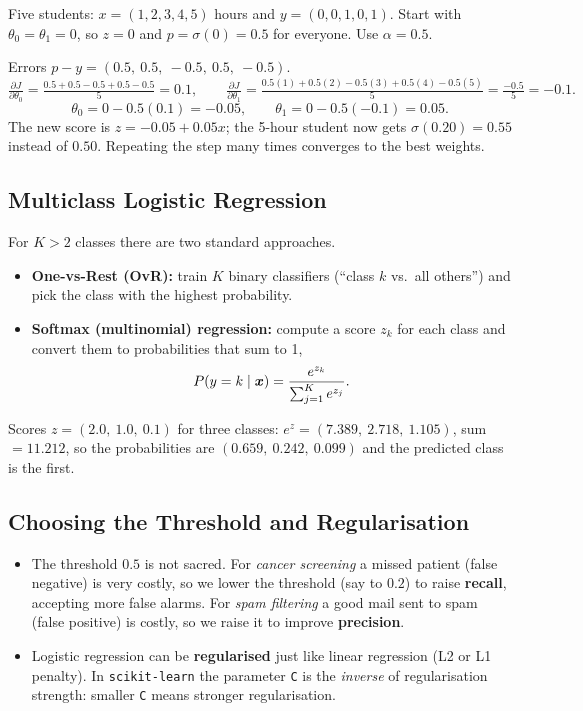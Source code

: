 \begin{example}
Five students: $x=(1,2,3,4,5)$ hours and $y=(0,0,1,0,1)$. Start with $\theta_0=\theta_1=0$, so $z=0$ and $p=\sigma(0)=0.5$ for everyone. Use $\alpha=0.5$.\par
Errors $p-y=(0.5,\ 0.5,\ -0.5,\ 0.5,\ -0.5)$.
\[
\tfrac{\partial J}{\partial\theta_0}=\tfrac{0.5+0.5-0.5+0.5-0.5}{5}=0.1,\qquad
\tfrac{\partial J}{\partial\theta_1}=\tfrac{0.5(1)+0.5(2)-0.5(3)+0.5(4)-0.5(5)}{5}=\tfrac{-0.5}{5}=-0.1 .
\]
\[
\theta_0=0-0.5(0.1)=-0.05,\qquad \theta_1=0-0.5(-0.1)=0.05 .
\]
The new score is $z=-0.05+0.05x$; the 5-hour student now gets $\sigma(0.20)=0.55$ instead of $0.50$. Repeating the step many times converges to the best weights.
\end{example}

\subsection{Multiclass Logistic Regression}

For $K>2$ classes there are two standard approaches.
\begin{itemize}
  \item \textbf{One-vs-Rest (OvR):} train $K$ binary classifiers (``class $k$ vs.\ all others'') and pick the class with the highest probability.
  \item \textbf{Softmax (multinomial) regression:} compute a score $z_k$ for each class and convert them to probabilities that sum to 1,
  \[
    P(y=k\mid\boldsymbol{x})=\frac{e^{z_k}}{\sum_{j=1}^{K}e^{z_j}} .
  \]
\end{itemize}

\begin{example}[: Softmax]
Scores $z=(2.0,\ 1.0,\ 0.1)$ for three classes: $e^{z}=(7.389,\ 2.718,\ 1.105)$, sum $=11.212$, so the probabilities are $(0.659,\ 0.242,\ 0.099)$ and the predicted class is the first.
\end{example}

\subsection{Choosing the Threshold and Regularisation}

\begin{itemize}
  \item The threshold $0.5$ is not sacred. For \emph{cancer screening} a missed patient (false negative) is very costly, so we lower the threshold (say to $0.2$) to raise \textbf{recall}, accepting more false alarms. For \emph{spam filtering} a good mail sent to spam (false positive) is costly, so we raise it to improve \textbf{precision}.
  \item Logistic regression can be \textbf{regularised} just like linear regression (L2 or L1 penalty). In \texttt{scikit-learn} the parameter \texttt{C} is the \emph{inverse} of regularisation strength: smaller \texttt{C} means stronger regularisation.
\end{itemize}

